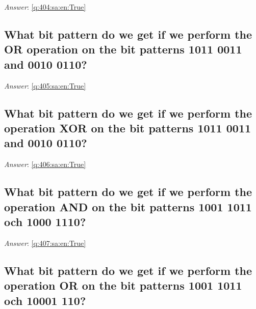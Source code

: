 \documentclass[a4paper,11pt,oneside]{article}
\begin{document}
\begin{sloppypar}
\vspace{1cm}

\textit{Answer}: \autoref{q:404:sa:en:True}



\subsection{What bit pattern do we get if we perform the OR operation on the bit patterns 1011 0011 and 0010 0110?}

\label{q:405:sa:en:False}

\vspace{2cm}

\noindent\makebox[\textwidth]{\hrulefill}

\vspace{1cm}

\textit{Answer}: \autoref{q:405:sa:en:True}



\subsection{What bit pattern do we get if we perform the operation XOR on the bit patterns 1011 0011 and 0010 0110?}

\label{q:406:sa:en:False}

\vspace{2cm}

\noindent\makebox[\textwidth]{\hrulefill}

\vspace{1cm}

\textit{Answer}: \autoref{q:406:sa:en:True}



\subsection{What bit pattern do we get if we perform the operation AND on the bit patterns 1001 1011 och 1000 1110?}

\label{q:407:sa:en:False}

\vspace{2cm}

\noindent\makebox[\textwidth]{\hrulefill}

\vspace{1cm}

\textit{Answer}: \autoref{q:407:sa:en:True}



\subsection{What bit pattern do we get if we perform the operation OR on the bit patterns 1001 1011 och 10001 110?}


\end{sloppypar}
\end{document}
